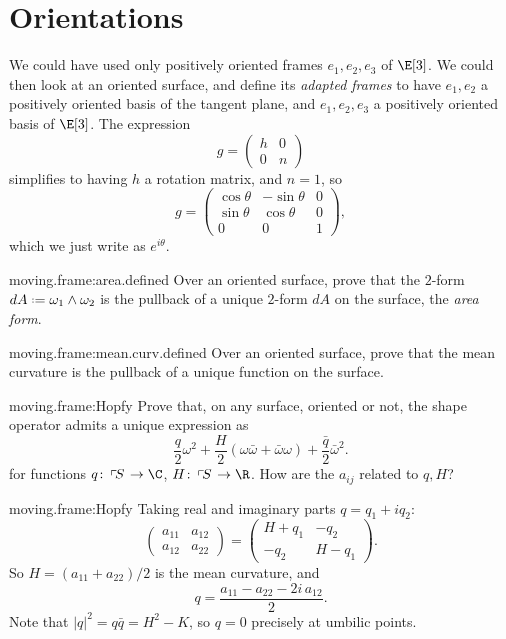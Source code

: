\section{Orientations}
We could have used only positively oriented frames \(e_1,e_2,e_3\) of \(\E[3]\).
We could then look at an oriented surface, and define its \emph{adapted frames} to have \(e_1,e_2\) a positively oriented basis of the tangent plane, and \(e_1,e_2,e_3\) a positively oriented basis of \(\E[3]\).
The expression 
\[
g=
\begin{pmatrix}
h & 0 \\
0 & n
\end{pmatrix}
\]
simplifies to having \(h\) a rotation matrix, and \(n=1\), so
\[
g=
\begin{pmatrix}
\cos \theta & -\sin \theta & 0 \\
\sin \theta & \cos \theta & 0 \\
0 & 0 & 1
\end{pmatrix},
\]
which we just write as \(e^{i\theta}\).
\begin{problem}{moving.frame:area.defined}
Over an oriented surface, prove that the \(2\)-form \(dA\defeq\omega_1\wedge\omega_2\) is the pullback of a unique \(2\)-form \(dA\) on the surface, the \emph{area form}.
\end{problem}
\begin{problem}{moving.frame:mean.curv.defined}
Over an oriented surface, prove that the mean curvature is the pullback of a unique function on the surface.
\end{problem}
\begin{problem}{moving.frame:Hopfy}
Prove that, on any surface, oriented or not, the shape operator admits a unique expression as 
\[
\frac{q}{2} \omega^2 + \frac{H}{2} (\omega \bar\omega + \bar\omega\omega) + \frac{\bar{q}}{2} \bar\omega^2.
\]
for functions \(q \colon \frameBundle{S} \to \C\),  \(H \colon \frameBundle{S} \to \R\).
How are the \(a_{ij}\) related to \(q,H\)?
\end{problem}
\begin{answer}{moving.frame:Hopfy}
Taking real and imaginary parts \(q=q_1+iq_2\):
\[
\begin{pmatrix}
a_{11} & a_{12} \\
a_{12} & a_{22}
\end{pmatrix}
=
\begin{pmatrix}
H+q_1 & -q_2 \\
-q_2 & H-q_1
\end{pmatrix}.
\]
So \(H=(a_{11}+a_{22})/2\) is the mean curvature, and
\[
q=\frac{a_{11}-a_{22}-2i\, a_{12}}{2}.
\]
Note that \(|q|^2=q\bar{q}=H^2-K\), so \(q=0\) precisely at umbilic points.
\end{answer}
